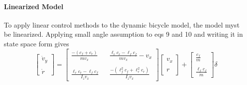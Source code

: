 \documentclass{article}
\begin{document}
\paragraph{Linearized Model} To apply linear control methods to the dynamic bicycle model, the model myst be linearized. Applying small angle assumption to eqs 9 and 10 and writing it in state space form gives
\begin{equation}
 \begin{bmatrix} \dot{v}_y \\\\ \dot{r} \end{bmatrix}
 =
 \begin{bmatrix} \frac{-(c_f + c_r)}{mv_x} && \frac{\ell_rc_r - \ell_fc_f}{mv_x} - v_x \\\\ \frac{\ell_rc_r - \ell_fc_f}{I_zv_x} && \frac{-(\ell^2_fc_f + \ell^2_rc_r)}{I_zv_x}\end{bmatrix}
  \begin{bmatrix}v_x \\\\ r\end{bmatrix} + 
  \begin{bmatrix}
  	\frac{c_f}{m} \\\\ \frac{\ell_fc_f}{m}
  \end{bmatrix}  \delta
\end{equation}
\end{document}
